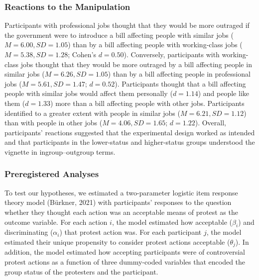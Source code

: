 \documentclass[12pt, letterpaper]{article}
\begin{document}
\hypertarget{reactions-to-the-manipulation}{%
\subsubsection{Reactions to the
Manipulation}\label{reactions-to-the-manipulation}}

Participants with professional jobs thought that they would be more
outraged if the government were to introduce a bill affecting people
with similar jobs (\(M = 6.00, SD = 1.05\)) than by a bill affecting
people with working-class jobs (\(M = 5.38, SD = 1.28\); Cohen's
\(d = 0.50\)). Conversely, participants with working-class jobs thought
that they would be more outraged by a bill affecting people in similar
jobs (\(M = 6.26, SD = 1.05\)) than by a bill affecting people in
professional jobs (\(M = 5.61, SD = 1.47\); \(d = 0.52\)). Participants
thought that a bill affecting people with similar jobs would affect them
personally (\(d = 1.14\)) and people like them (\(d = 1.33\)) more than
a bill affecting people with other jobs. Participants identified to a
greater extent with people in similar jobs (\(M = 6.21, SD = 1.12\))
than with people in other jobs (\(M = 4.06, SD = 1.65\); \(d = 1.22\)).
Overall, participants' reactions suggested that the experimental design
worked as intended and that participants in the lower-status and
higher-status groups understood the vignette in ingroup--outgroup terms.

\hypertarget{preregistered-analyses}{%
\subsubsection{Preregistered Analyses}\label{preregistered-analyses}}

To test our hypotheses, we estimated a two-parameter logistic item
response theory model (Bürkner, 2021) with participants' responses to
the question whether they thought each action was an acceptable means of
protest as the outcome variable. For each action \(i\), the model
estimated how acceptable (\(\beta_i\)) and discriminating (\(\alpha_i\))
that protest action was. For each participant \(j\), the model estimated
their unique propensity to consider protest actions acceptable
(\(\theta_j\)). In addition, the model estimated how accepting
participants were of controversial protest actions as a function of
three dummy-coded variables that encoded the group status of the
protesters and the participant.
\end{document}

